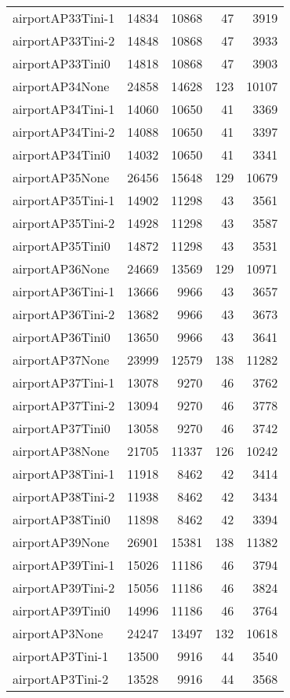 \begin{longtable}{lrrrr}
airportAP33Tini-1 & 14834 & 10868 & 47 & 3919 \\
airportAP33Tini-2 & 14848 & 10868 & 47 & 3933 \\
airportAP33Tini0 & 14818 & 10868 & 47 & 3903 \\
airportAP34None & 24858 & 14628 & 123 & 10107 \\
airportAP34Tini-1 & 14060 & 10650 & 41 & 3369 \\
airportAP34Tini-2 & 14088 & 10650 & 41 & 3397 \\
airportAP34Tini0 & 14032 & 10650 & 41 & 3341 \\
airportAP35None & 26456 & 15648 & 129 & 10679 \\
airportAP35Tini-1 & 14902 & 11298 & 43 & 3561 \\
airportAP35Tini-2 & 14928 & 11298 & 43 & 3587 \\
airportAP35Tini0 & 14872 & 11298 & 43 & 3531 \\
airportAP36None & 24669 & 13569 & 129 & 10971 \\
airportAP36Tini-1 & 13666 & 9966 & 43 & 3657 \\
airportAP36Tini-2 & 13682 & 9966 & 43 & 3673 \\
airportAP36Tini0 & 13650 & 9966 & 43 & 3641 \\
airportAP37None & 23999 & 12579 & 138 & 11282 \\
airportAP37Tini-1 & 13078 & 9270 & 46 & 3762 \\
airportAP37Tini-2 & 13094 & 9270 & 46 & 3778 \\
airportAP37Tini0 & 13058 & 9270 & 46 & 3742 \\
airportAP38None & 21705 & 11337 & 126 & 10242 \\
airportAP38Tini-1 & 11918 & 8462 & 42 & 3414 \\
airportAP38Tini-2 & 11938 & 8462 & 42 & 3434 \\
airportAP38Tini0 & 11898 & 8462 & 42 & 3394 \\
airportAP39None & 26901 & 15381 & 138 & 11382 \\
airportAP39Tini-1 & 15026 & 11186 & 46 & 3794 \\
airportAP39Tini-2 & 15056 & 11186 & 46 & 3824 \\
airportAP39Tini0 & 14996 & 11186 & 46 & 3764 \\
airportAP3None & 24247 & 13497 & 132 & 10618 \\
airportAP3Tini-1 & 13500 & 9916 & 44 & 3540 \\
airportAP3Tini-2 & 13528 & 9916 & 44 & 3568 \\

\end{longtable}
